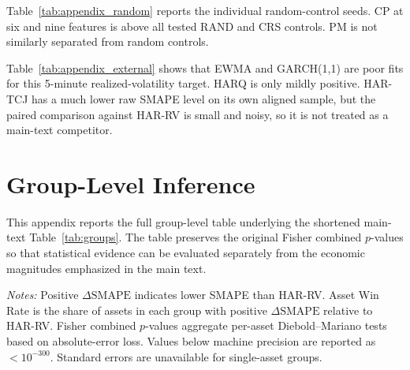 \documentclass[11pt,a4paper]{article}
\begin{document}
\noindent
Table~\ref{tab:appendix_random} reports the individual random-control seeds. CP at six and nine features is above all tested RAND and CRS controls. PM is not similarly separated from random controls.

{\renewcommand{\thetable}{D5}
\begin{center}
\label{tab:appendix_external}
\scriptsize
\renewcommand{\arraystretch}{1.08}
\resizebox{0.62\textwidth}{!}{}
\end{center}}

\noindent
Table~\ref{tab:appendix_external} shows that EWMA and GARCH(1,1) are poor fits for this 5-minute realized-volatility target. HARQ is only mildly positive. HAR-TCJ has a much lower raw SMAPE level on its own aligned sample, but the paired comparison against HAR-RV is small and noisy, so it is not treated as a main-text competitor.


\clearpage

\section{Group-Level Inference}

\noindent
This appendix reports the full group-level table underlying the shortened main-text Table~\ref{tab:groups}. The table preserves the original Fisher combined $p$-values so that statistical evidence can be evaluated separately from the economic magnitudes emphasized in the main text.

{\renewcommand{\thetable}{E1}
\begin{center}
\label{tab:groups_full}
\small
\renewcommand{\arraystretch}{1.15}
\setlength{\tabcolsep}{8pt}
\resizebox{0.88\textwidth}{!}{}

\vspace{0.1cm}
\footnotesize \parbox{0.92\textwidth}{\textit{Notes:} Positive $\Delta \mathrm{SMAPE}$ indicates lower SMAPE than HAR-RV. Asset Win Rate is the share of assets in each group with positive $\Delta \mathrm{SMAPE}$ relative to HAR-RV. Fisher combined $p$-values aggregate per-asset Diebold--Mariano tests based on absolute-error loss. Values below machine precision are reported as $< 10^{-300}$. Standard errors are unavailable for single-asset groups.}
\end{center}}
\end{document}
